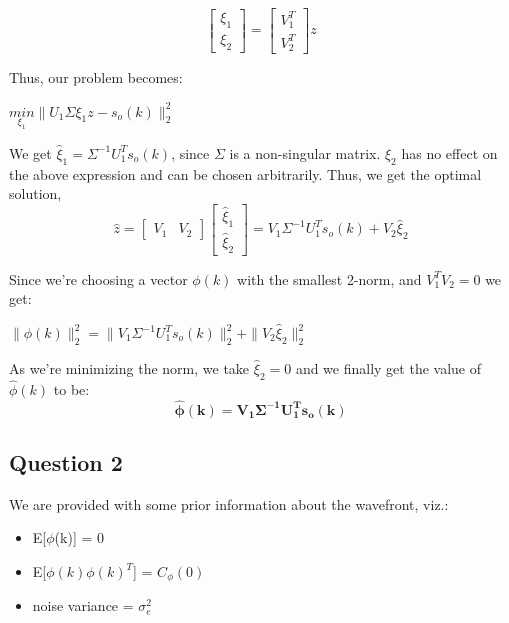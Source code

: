 \documentclass[12pt]{report}
\begin{document}
\begin{equation*}
\begin{bmatrix}
\xi_{1} \\
\xi_{2}
\end{bmatrix}
=
\begin{bmatrix}
V_{1}^{T} \\
V_{2}^{T}
\end{bmatrix}z
\end{equation*}

Thus, our problem becomes:

$\underset{\xi_{1}}{min} \| U_{1}\Sigma\xi_{1}z - s_{o}(k)\|_{2}^{2}$

We get $\hat\xi_{1} = \Sigma^{-1}U_{1}^{T}s_{o}(k)$, since $\Sigma$ is a non-singular matrix. $\xi_{2}$ has no effect on the above expression and can be chosen arbitrarily. Thus, we get the optimal solution,
\begin{equation*}
\hat{z} = \begin{bmatrix}
V_{1} & V_{2}
\end{bmatrix}
\begin{bmatrix}
\hat\xi_{1} \\
\hat\xi_{2}
\end{bmatrix}
= V_{1}\Sigma^{-1}U_{1}^{T}s_{o}(k) + V_{2}\hat\xi_{2}
\end{equation*}

Since we're choosing a vector $\phi(k)$ with the smallest 2-norm, and $V_{1}^{T}V_{2} = 0$ we get:

$\|\phi(k)\|_{2}^{2} = \| V_{1}\Sigma^{-1}U_{1}^{T}s_{o}(k)\|_{2}^{2} + \| V_{2}\hat\xi_{2} \|_{2}^{2}$

As we're minimizing the norm, we take $\hat\xi_{2} = 0$ and we finally get the value of $\hat\phi(k)$ to be:
\begin{equation*}
\mathbf{\hat\phi(k) = V_{1}\Sigma^{-1}U_{1}^{T}s_{o}(k)}
\end{equation*}

\subsection*{Question 2}

We are provided with some prior information about the wavefront, viz.:

\begin{itemize}
	\item E[$\phi$(k)] = 0
	\item E[$\phi(k)\phi(k)^T$] = $C_{\phi}(0)$
	\item noise variance = $\sigma_{e}^{2}$
\end{itemize}
  
\end{document}
